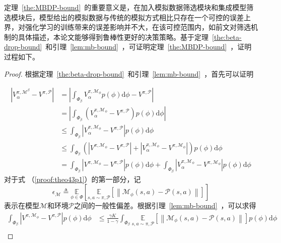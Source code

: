 定理~\ref{the:MBDP-bound}~的重要意义是，在加入模拟数据筛选模块和集成模型筛选模块后，模型给出的模拟数据与传统的模拟方式相比只存在一个可控的误差上界，对强化学习的训练带来的误差影响并不大，在该可控范围内，如前文对筛选机制的具体描述，本论文能够得到鲁棒性更好的决策策略。基于定理~\ref{the:beta-drop-bound}~和引理~\ref{lem:mb-bound}~，可证明定理~\ref{the:MBDP-bound}~，证明过程如下。

\begin{proof}

根据定理~\ref{the:beta-drop-bound}~和引理~\ref{lem:mb-bound}~，首先可以证明

\begin{align}
\left|{V}_\alpha^{\pi, \mathcal{M}^\beta}-{V}^{\pi, \mathcal{P}}\right|&=\left|\int_{\Phi_\beta}{V}_\alpha^{\pi, \mathcal{M}_{\phi}}p(\phi)\mathrm{d}\phi-{V}^{\pi, \mathcal{P}}\right| \\
&=\left|\int_{\Phi_\beta}\left({V}_\alpha^{\pi, \mathcal{M}_{\phi}}-{V}^{\pi, \mathcal{P}}\right)p(\phi)\mathrm{d}\phi\right| \\
&\leq\int_{\Phi_\beta}\left|{V}_\alpha^{\pi, \mathcal{M}_{\phi}}-{V}^{\pi, \mathcal{P}}\right|p(\phi)\mathrm{d}\phi\\
&\leq\int_{\Phi_\beta}\left(\left|{V}^{\pi, \mathcal{M}_{\phi}}-{V}^{\pi, \mathcal{P}}\right|+\left|{V}_\alpha^{\pi, \mathcal{M}_{\phi}} - {V}^{\pi,\mathcal{M}_{\phi}}\right|\right)p(\phi)\mathrm{d}\phi\\
&= \int_{\Phi_\beta}\left|{V}^{\pi, \mathcal{M}_{\phi}}-{V}^{\pi, \mathcal{P}}\right|p(\phi)\mathrm{d}\phi+\int_{\Phi_\beta}\left|{V}_\alpha^{\pi, \mathcal{M}_{\phi}} - {V}^{\pi,\mathcal{M}_{\phi}}\right|p(\phi)\mathrm{d}\phi \label{proof:theo43p1}
\end{align}
对于式 （\ref{proof:theo43p1}）的第一部分，记
\begin{equation}
    \epsilon_{\mathcal{M}}\triangleq\underset{\phi\in\Phi}{\mathbb{E}}\left[\underset{s,a\sim \pi,\mathcal{P}}{\mathbb{E}}\left[\left\|\mathcal{M}_\phi(s, a)-\mathcal{P}(s, a)\right\|\right]\right]
\end{equation}
表示在模型$\mathcal{M}$和环境$\mathcal{P}$之间的一般性偏差。根据引理~\ref{lem:mb-bound}~，可以求得
\begin{align}
\int_{\Phi_\beta}\left|{V}^{\pi, \mathcal{M}_{\phi}}-{V}^{\pi, \mathcal{P}}\right|p(\phi)\mathrm{d}\phi &\leq \frac{\gamma K}{1-\gamma}\int_{\Phi_\beta}\underset{s,a\sim\pi,\mathcal{P}}{\mathbb{E}}\left[\left\|\mathcal{M}_\phi(s, a)-\mathcal{P}(s, a)\right\|\right]p(\phi)\mathrm{d}\phi\\

\end{align}
\end{proof}
